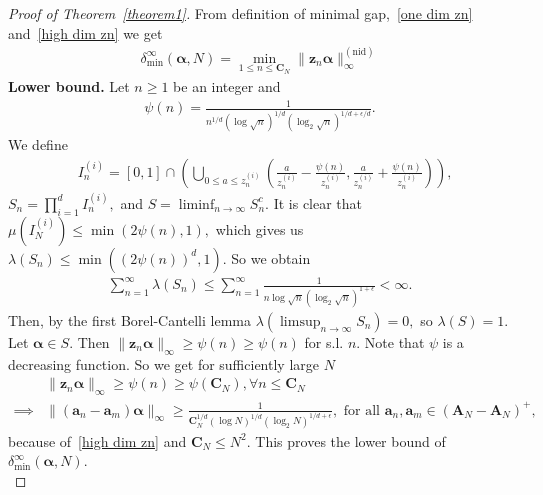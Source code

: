 \documentclass[12pt,article]{amsart}
\theoremstyle{remark}
\numberwithin{equation}{section}
\newcommand{\boldzn}{\boldsymbol{z}_n}
\newcommand{\bolda}{\boldsymbol{a}}
\newcommand{\boldA}{\boldsymbol{A}}
\newcommand{\boldCN}{\boldsymbol{C}_N}
\newcommand{\boldalpha}{\boldsymbol{\alpha}}
\begin{document}
	\begin{proof}[Proof of Theorem~\ref{theorem1}]
		From definition of minimal gap,~\eqref{one dim zn} and~\eqref{high dim zn} we get
		\begin{align*}
			\delta_{\text{min}}^{\infty}(\boldalpha,N)=\min_{1\leq n\leq\boldCN}\|\boldzn\boldalpha\|_{\infty}^{(\text{nid})}
		\end{align*}
		\textbf{Lower bound.} Let $n\geq 1$ be an integer and 
		\begin{align*}
			\psi(n)=\frac{1}{n^{1/d}(\log\sqrt{n})^{1/d}(\log_2\sqrt{n})^{1/d+\epsilon/d}}.
		\end{align*}
		We define
		\begin{align*}
			&I_n^{(i)}=[0,1]\cap\left(\bigcup_{0\leq a\leq z_{n}^{(i)}}\left(\frac{a}{z_n^{(i)}}-\frac{\psi(n)}{z_n^{(i)}},\frac{a}{z_n^{(i)}}+\frac{\psi(n)}{z_n^{(i)}}\right)\right),
		\end{align*}
		$\displaystyle S_n=\prod_{i=1}^{d}I_n^{(i)},$
		and $S=\liminf_{n\to\infty}S_n^c.$ It is clear that $\mu\left(I_N^{(i)}\right)\leq\min(2\psi(n),1),$ which gives us $\lambda(S_n)\leq\min((2\psi(n))^d,1).$ So we obtain
		\begin{align*}
			\sum_{n=1}^{\infty}\lambda(S_n)\leq\sum_{n=1}^{\infty}\frac{1}{n\log \sqrt{n}(\log_2 \sqrt{n})^{1+\epsilon}}<\infty.
		\end{align*}
		Then, by the first Borel-Cantelli lemma $\lambda(\limsup_{n\to\infty}S_n)=0,$ so $\lambda(S)=1.$ 
		Let $\boldalpha\in S.$ Then $\|\boldzn\boldalpha\|_{\infty}\geq\psi(n)\geq\psi(n)$ for s.l. $n.$
		Note that $\psi$ is a decreasing function. So we get for sufficiently large $N$ 
		\begin{align*}
			&\|\boldzn\boldalpha\|_{\infty}\geq \psi(n)\geq\psi(\boldCN),\forall n\leq \boldCN\\
			\implies&\|(\bolda_n-\bolda_m)\boldalpha\|_{\infty}\geq \frac{1}{\boldCN^{1/d}(\log N)^{1/d}(\log_2 N)^{1/d+\epsilon}}, \text{ for all } \bolda_n,\bolda_m\in(\boldA_N-\boldA_N)^{+},
		\end{align*}
		because of~\eqref{high dim zn} and $\boldCN\leq N^2$. This proves the lower bound of $\delta_{\text{min}}^{\infty}(\boldalpha, N).$\\
		

\end{proof}
\end{document}
